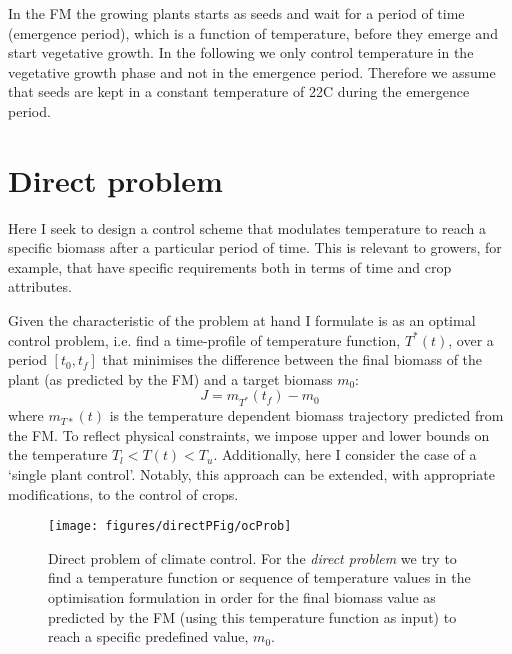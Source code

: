 In the FM the growing plants starts as seeds and wait for a period of time
(emergence period), which is a function of temperature, before they emerge and
start vegetative growth. In the following we only control temperature in the
vegetative growth phase and not in the emergence period. Therefore we assume
that seeds are kept in a constant temperature of 22\textdegree C during the
emergence period.


\section{Direct problem}
Here I seek to design a control scheme that modulates temperature to reach a
specific biomass after a particular period of time. This is relevant to growers,
for example, that have specific requirements both in terms of time and crop
attributes.

Given the characteristic of the problem at hand I formulate is as an optimal
control problem, i.e. find a time-profile of temperature function, $T^*(t)$,
over a period $[t_0, t_f]$ that minimises the difference between the final
biomass of the plant (as predicted by the FM) and a target biomass $m_0$:
$$
J = m_{T^*}(t_f) - m_0
$$
where $m_{T*}(t)$ is the temperature dependent biomass trajectory predicted from
the FM. To reflect physical constraints, we impose upper and lower bounds on the
temperature $T_l < T(t) < T_u$. Additionally, here I consider the case of a
`single plant control'. Notably, this approach can be extended, with
appropriate modifications, to the control of crops.

\begin{figure}[tb]
\centering
\texttt{[image: figures/directPFig/ocProb]}
\caption{Direct problem of climate control. For the \emph{direct problem} we try
  to find a temperature function or sequence of temperature values in the
  optimisation formulation in order for the final biomass value as predicted by
  the FM (using this temperature function as input) to reach a specific
  predefined value, $m_0$.}
\label{fig:directP}
\end{figure}

